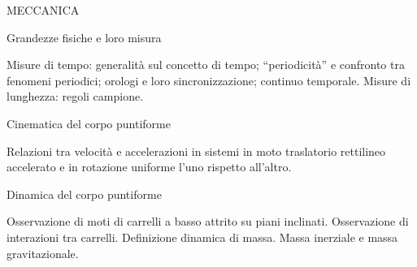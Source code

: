 MECCANICA



Grandezze fisiche e loro misura

Misure di tempo: generalità sul concetto di tempo; “periodicità” e confronto tra fenomeni periodici; orologi e loro sincronizzazione; continuo temporale. 
Misure di lunghezza: regoli campione. 







Cinematica del corpo puntiforme

Relazioni tra velocità e accelerazioni in sistemi in moto traslatorio rettilineo accelerato e in rotazione uniforme l'uno rispetto all’altro.



Dinamica del corpo puntiforme

Osservazione di moti di carrelli a basso attrito su piani inclinati. 
Osservazione di interazioni tra carrelli. 
Definizione dinamica di massa. 
Massa inerziale e massa gravitazionale. 



